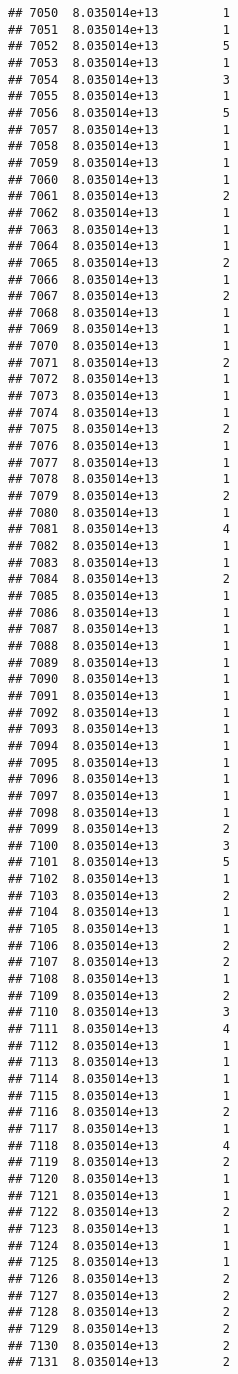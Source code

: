 \documentclass[
]{article}
\begin{document}
\begin{verbatim}
## 7050  8.035014e+13         1
## 7051  8.035014e+13         1
## 7052  8.035014e+13         5
## 7053  8.035014e+13         1
## 7054  8.035014e+13         3
## 7055  8.035014e+13         1
## 7056  8.035014e+13         5
## 7057  8.035014e+13         1
## 7058  8.035014e+13         1
## 7059  8.035014e+13         1
## 7060  8.035014e+13         1
## 7061  8.035014e+13         2
## 7062  8.035014e+13         1
## 7063  8.035014e+13         1
## 7064  8.035014e+13         1
## 7065  8.035014e+13         2
## 7066  8.035014e+13         1
## 7067  8.035014e+13         2
## 7068  8.035014e+13         1
## 7069  8.035014e+13         1
## 7070  8.035014e+13         1
## 7071  8.035014e+13         2
## 7072  8.035014e+13         1
## 7073  8.035014e+13         1
## 7074  8.035014e+13         1
## 7075  8.035014e+13         2
## 7076  8.035014e+13         1
## 7077  8.035014e+13         1
## 7078  8.035014e+13         1
## 7079  8.035014e+13         2
## 7080  8.035014e+13         1
## 7081  8.035014e+13         4
## 7082  8.035014e+13         1
## 7083  8.035014e+13         1
## 7084  8.035014e+13         2
## 7085  8.035014e+13         1
## 7086  8.035014e+13         1
## 7087  8.035014e+13         1
## 7088  8.035014e+13         1
## 7089  8.035014e+13         1
## 7090  8.035014e+13         1
## 7091  8.035014e+13         1
## 7092  8.035014e+13         1
## 7093  8.035014e+13         1
## 7094  8.035014e+13         1
## 7095  8.035014e+13         1
## 7096  8.035014e+13         1
## 7097  8.035014e+13         1
## 7098  8.035014e+13         1
## 7099  8.035014e+13         2
## 7100  8.035014e+13         3
## 7101  8.035014e+13         5
## 7102  8.035014e+13         1
## 7103  8.035014e+13         2
## 7104  8.035014e+13         1
## 7105  8.035014e+13         1
## 7106  8.035014e+13         2
## 7107  8.035014e+13         2
## 7108  8.035014e+13         1
## 7109  8.035014e+13         2
## 7110  8.035014e+13         3
## 7111  8.035014e+13         4
## 7112  8.035014e+13         1
## 7113  8.035014e+13         1
## 7114  8.035014e+13         1
## 7115  8.035014e+13         1
## 7116  8.035014e+13         2
## 7117  8.035014e+13         1
## 7118  8.035014e+13         4
## 7119  8.035014e+13         2
## 7120  8.035014e+13         1
## 7121  8.035014e+13         1
## 7122  8.035014e+13         2
## 7123  8.035014e+13         1
## 7124  8.035014e+13         1
## 7125  8.035014e+13         1
## 7126  8.035014e+13         2
## 7127  8.035014e+13         2
## 7128  8.035014e+13         2
## 7129  8.035014e+13         2
## 7130  8.035014e+13         2
## 7131  8.035014e+13         2

\end{verbatim}
\end{document}
